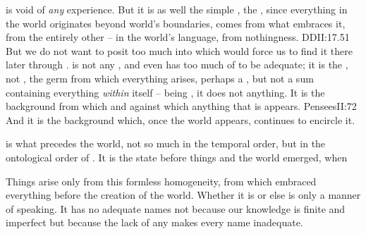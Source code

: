 \pa {} is void of {\em any} experience.  But it is as well the
simple , the , since everything in the world originates
beyond world's boundaries, comes from what embraces it, from the entirely other
-- in the world's language, from nothingness. \citet{Sacred ignorance teaches me
  that which seems to the intellect to be nothing is the incomprehensible
  Maximum}{DDI}{I:17.51} But we do not want to posit too much into
 which would force us to find it there later through .   is not any , and even  has too much of  to be adequate; it is the ,
not  , the germ from which everything arises, perhaps a
, but not a sum containing everything {\em within} itself -- being
, it does not  anything.  It is the background from
which and against which anything that is appears.  \citet{All things proceed
  from the Nothing, and are borne towards the Infinite.}{Pensees}{II:72} And it
is the background which, once the world appears, continues to encircle it.


\pa {} is what precedes the world, not so much in the temporal
order, but in the ontological order of . It is the state before
things and the world emerged, when 

Things arise only from this formless homogeneity, from  which embraced everything before the creation of the world.
Whether it is  or else  is only a manner of speaking.  It has no adequate names not because
our knowledge is finite and imperfect but because the lack of any
 makes every name inadequate.


